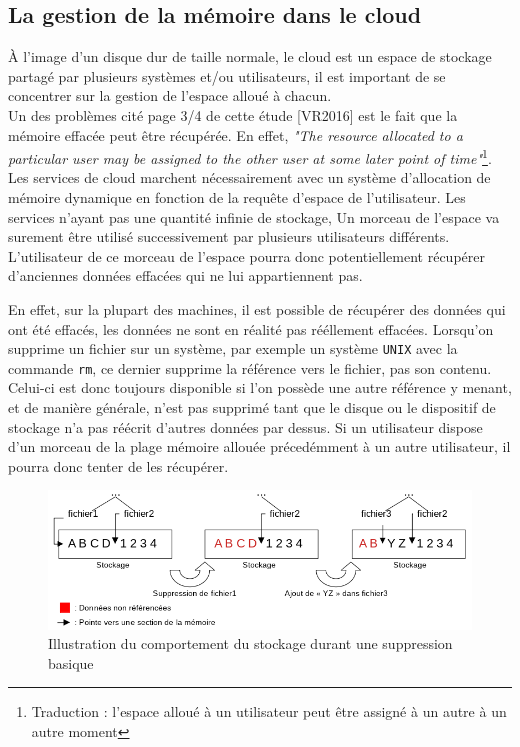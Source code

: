 \documentclass[a4paper, 12pt]{article}
\begin{document}
\begin{spacing}{1.1}
    \subsection{La gestion de la mémoire dans le cloud}
      À l'image d'un disque dur de taille normale, le cloud est un espace de
      stockage partagé par plusieurs systèmes et/ou utilisateurs, il est
      important de se concentrer sur la gestion de l'espace alloué à chacun. \\

      Un des problèmes cité page 3/4 de cette étude [VR2016] est le fait que la
      mémoire effacée peut être récupérée. En effet, \textit{"The resource
      allocated to a particular user may be assigned to the other user at some
      later point of time"}\footnote{Traduction : l'espace alloué à un
      utilisateur peut être assigné à un autre à un autre moment}. Les services
      de cloud marchent nécessairement avec un système d'allocation de mémoire
      dynamique en fonction de la requête d'espace de l'utilisateur. Les
      services n'ayant pas une quantité infinie de stockage, Un morceau de
      l'espace va surement être utilisé successivement par plusieurs
      utilisateurs différents. L'utilisateur de ce morceau de l'espace pourra
      donc potentiellement récupérer d'anciennes données effacées qui ne lui
      appartiennent pas.

      En effet, sur la plupart des machines, il est possible de récupérer des
      données qui ont été effacés, les données ne sont en réalité pas rééllement
      effacées. Lorsqu'on supprime un fichier sur un système, par exemple un
      système \verb+UNIX+ avec la commande \verb+rm+, ce dernier supprime la
      référence vers le fichier, pas son contenu. Celui-ci est donc toujours
      disponible si l'on possède une autre référence y menant, et de manière
      générale, n'est pas supprimé tant que le disque ou le dispositif de
      stockage n'a pas réécrit d'autres données par dessus. Si un utilisateur
      dispose d'un morceau de la plage mémoire allouée précedémment à un autre
      utilisateur, il pourra donc tenter de les récupérer.

      \begin{figure}[h]
        \centering
        \includegraphics[scale=.6]{img/schema_memoire.png}
        \caption{Illustration du comportement du stockage durant une suppression
        basique}
      \end{figure}


\end{spacing}
\end{document}
